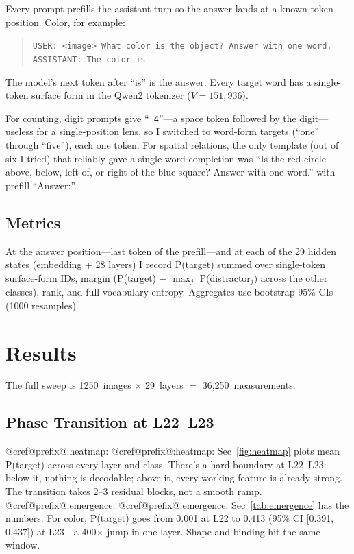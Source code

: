 \documentclass{article}
\makeatletter
\providecommand{\Cref}[1]{%
  \def\@cref@@@{#1}%
  \edef\@cref@prefix{\expandafter\@cref@parse@\@cref@@@:\@nil}%
  \@cref@printprefix{\@cref@prefix}~\ref{#1}}
\def\@cref@parse@#1:#2\@nil{#1}
\def\@cref@printprefix#1{%
  \ifcsname @cref@prefix@#1\endcsname
    \csname @cref@prefix@#1\endcsname
  \else Sec\fi}
\makeatother
\begin{document}
Every prompt prefills the assistant turn so the answer lands at a known token position.
Color, for example:
\begin{quote}
\small
\texttt{USER: <image> What color is the object? Answer with one word.} \\
\texttt{ASSISTANT: The color is}
\end{quote}
The model's next token after ``is'' is the answer.
Every target word has a single-token surface form in the Qwen2 tokenizer ($V{=}151{,}936$).

For counting, digit prompts give ``\texttt{ 4}''---a space token followed by the digit---useless for a single-position lens, so I switched to word-form targets (``one'' through ``five''), each one token.
For spatial relations, the only template (out of six I tried) that reliably gave a single-word completion was ``Is the red circle above, below, left of, or right of the blue square? Answer with one word.'' with prefill ``Answer:''.

\subsection{Metrics}

At the answer position---last token of the prefill---and at each of the 29 hidden states (embedding + 28 layers) I record P(target) summed over single-token surface-form IDs, margin (P(target) $-$ $\max_j$ P(distractor$_j$) across the other classes), rank, and full-vocabulary entropy.
Aggregates use bootstrap 95\% CIs (1000 resamples).

\section{Results}
\label{sec:results}

The full sweep is 1250~images $\times$ 29~layers $=$ 36{,}250~measurements.

\subsection{Phase Transition at L22--L23}

\Cref{fig:heatmap} plots mean P(target) across every layer and class.
There's a hard boundary at L22--L23: below it, nothing is decodable; above it, every working feature is already strong.
The transition takes 2--3 residual blocks, not a smooth ramp.
\Cref{tab:emergence} has the numbers.
For color, P(target) goes from 0.001 at L22 to 0.413 (95\% CI [0.391, 0.437]) at L23---a 400$\times$ jump in one layer.
Shape and binding hit the same window.
\end{document}
